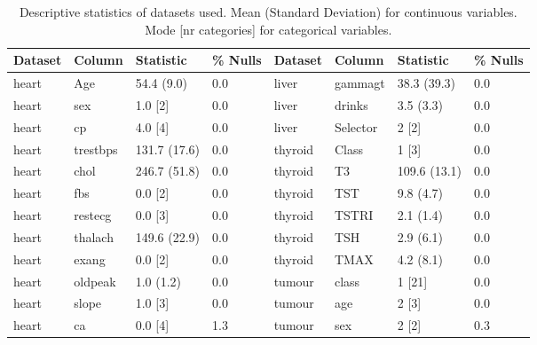 \begin{small}    
\begin{table}[htpb]
    \footnotesize
        \caption{Descriptive statistics of datasets used. Mean (Standard Deviation) for continuous variables. Mode [nr categories] for categorical variables.}\label{tab:descrptive_feature}
            \begin{tabularx}{\textwidth}{lXll|lXll}
                \toprule
            Dataset & Column                         & Statistic    & \% Nulls & Dataset & Column          & Statistic    & \% Nulls \\
            \midrule
            heart   & Age                            & 54.4 (9.0)   & 0.0      & liver   & gammagt         & 38.3 (39.3)  & 0.0      \\
            heart   & sex                            & 1.0 {[}2{]}  & 0.0      & liver   & drinks          & 3.5 (3.3)    & 0.0      \\
            heart   & cp                             & 4.0 {[}4{]}  & 0.0      & liver   & Selector        & 2 {[}2{]}    & 0.0      \\
            heart   & trestbps                       & 131.7 (17.6) & 0.0      & thyroid & Class           & 1 {[}3{]}    & 0.0      \\
            heart   & chol                           & 246.7 (51.8) & 0.0      & thyroid & T3              & 109.6 (13.1) & 0.0      \\
            heart   & fbs                            & 0.0 {[}2{]}  & 0.0      & thyroid & TST             & 9.8 (4.7)    & 0.0      \\
            heart   & restecg                        & 0.0 {[}3{]}  & 0.0      & thyroid & TSTRI           & 2.1 (1.4)    & 0.0      \\
            heart   & thalach                        & 149.6 (22.9) & 0.0      & thyroid & TSH             & 2.9 (6.1)    & 0.0      \\
            heart   & exang                          & 0.0 {[}2{]}  & 0.0      & thyroid & TMAX            & 4.2 (8.1)    & 0.0      \\
            heart   & oldpeak                        & 1.0 (1.2)    & 0.0      & tumour   & class           & 1 {[}21{]}   & 0.0      \\
            heart   & slope                          & 1.0 {[}3{]}  & 0.0      & tumour   & age             & 2 {[}3{]}    & 0.0      \\
            heart   & ca                             & 0.0 {[}4{]}  & 1.3      & tumour   & sex             & 2 {[}2{]}    & 0.3      \\

\end{tabularx}
\end{table}
\end{small}
